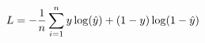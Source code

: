 \documentclass[preview]{standalone}
\begin{document}
\begin{align*}
\special{dvisvgm:raw <g id='unique000'>}L=- \special{dvisvgm:raw </g>}\special{dvisvgm:raw <g id='unique001'>}\frac{1}{n} \special{dvisvgm:raw </g>}\special{dvisvgm:raw <g id='unique002'>}\sum^n_{i=1}y\log(\hat{y})+(1-y)\log(1-\hat{y})\special{dvisvgm:raw </g>}
\end{align*}
\end{document}
